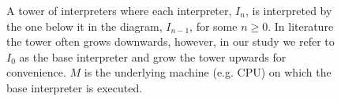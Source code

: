 \documentclass[a4paper,12pt,twoside,openright]{report}
\theoremstyle{definition}
\begin{document}
\begin{figure}
    \centering
    \caption{A tower of interpreters where each interpreter, $I_n$, is interpreted by the one below it in the diagram, $I_{n-1}$, for some $n \geq 0$. In literature the tower often grows downwards, however, in our study we refer to $I_0$ as the base interpreter and grow the tower upwards for convenience. $M$ is the underlying machine (e.g. CPU) on which the base interpreter is executed.}
    \label{fig:tombstone_tower_ex1}
\end{figure}

\end{document}
